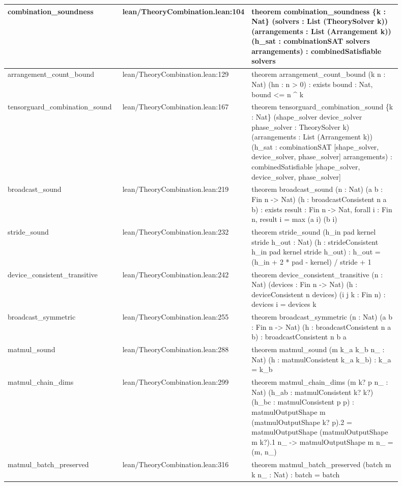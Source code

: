 \documentclass[10pt]{article}
\begin{document}
\begin{longtable}{|p{0.30\linewidth}|p{0.13\linewidth}|p{0.47\linewidth}|}
\hline
combination\_soundness & lean/TheoryCombination.lean:104 & theorem combination\_soundness \{k : Nat\} (solvers : List (TheorySolver k)) (arrangements : List (Arrangement k)) (h\_sat : combinationSAT solvers arrangements) : combinedSatisfiable solvers \\
\hline
arrangement\_count\_bound & lean/TheoryCombination.lean:129 & theorem arrangement\_count\_bound (k n : Nat) (hn : n > 0) : exists bound : Nat, bound <= n \textasciicircum{} k \\
\hline
tensorguard\_combination\_sound & lean/TheoryCombination.lean:167 & theorem tensorguard\_combination\_sound \{k : Nat\} (shape\_solver device\_solver phase\_solver : TheorySolver k) (arrangements : List (Arrangement k)) (h\_sat : combinationSAT [shape\_solver, device\_solver, phase\_solver] arrangements) : combinedSatisfiable [shape\_solver, device\_solver, phase\_solver] \\
\hline
broadcast\_sound & lean/TheoryCombination.lean:219 & theorem broadcast\_sound (n : Nat) (a b : Fin n -> Nat) (h : broadcastConsistent n a b) : exists result : Fin n -> Nat, forall i : Fin n, result i = max (a i) (b i) \\
\hline
stride\_sound & lean/TheoryCombination.lean:232 & theorem stride\_sound (h\_in pad kernel stride h\_out : Nat) (h : strideConsistent h\_in pad kernel stride h\_out) : h\_out = (h\_in + 2 * pad - kernel) / stride + 1 \\
\hline
device\_consistent\_transitive & lean/TheoryCombination.lean:242 & theorem device\_consistent\_transitive (n : Nat) (devices : Fin n -> Nat) (h : deviceConsistent n devices) (i j k : Fin n) : devices i = devices k \\
\hline
broadcast\_symmetric & lean/TheoryCombination.lean:255 & theorem broadcast\_symmetric (n : Nat) (a b : Fin n -> Nat) (h : broadcastConsistent n a b) : broadcastConsistent n b a \\
\hline
matmul\_sound & lean/TheoryCombination.lean:288 & theorem matmul\_sound (m k\_a k\_b n\_ : Nat) (h : matmulConsistent k\_a k\_b) : k\_a = k\_b \\
\hline
matmul\_chain\_dims & lean/TheoryCombination.lean:299 & theorem matmul\_chain\_dims (m k? p n\_ : Nat) (h\_ab : matmulConsistent k? k?) (h\_bc : matmulConsistent p p) : matmulOutputShape m (matmulOutputShape k? p).2 = matmulOutputShape (matmulOutputShape m k?).1 n\_ -> matmulOutputShape m n\_ = (m, n\_) \\
\hline
matmul\_batch\_preserved & lean/TheoryCombination.lean:316 & theorem matmul\_batch\_preserved (batch m k n\_ : Nat) : batch = batch \\

\end{longtable}
\end{document}
